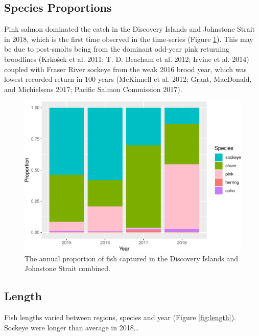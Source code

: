 \documentclass[fleqn,10pt]{wlpeerj} %
\begin{document}
\subsection*{Species Proportions}\label{species-proportions}

Pink salmon dominated the catch in the Discovery Islands and Johnstone
Strait in 2018, which is the first time observed in the time-series
(Figure \ref{fig:prop}). This may be due to post-smolts being from the
dominant odd-year pink returning broodlines (Krkošek et al. 2011; T. D.
Beacham et al. 2012; Irvine et al. 2014) coupled with Fraser River
sockeye from the weak 2016 brood year, which was lowest recorded return
in 100 years (McKinnell et al. 2012; Grant, MacDonald, and Michielsens
2017; Pacific Salmon Commission 2017).

\begin{figure}[H]
\includegraphics[width=0.8\linewidth]{peer_j_migration_dynamics_files/figure-latex/prop-1} \caption{The annual proportion of fish captured in the Discovery Islands and Johnstone Strait combined.}\label{fig:prop}
\end{figure}

\subsection*{Length}\label{length}

Fish lengths varied between regions, species and year (Figure
\ref{fig:length}). Sockeye were longer than average in 2018\ldots{}
\end{document}
